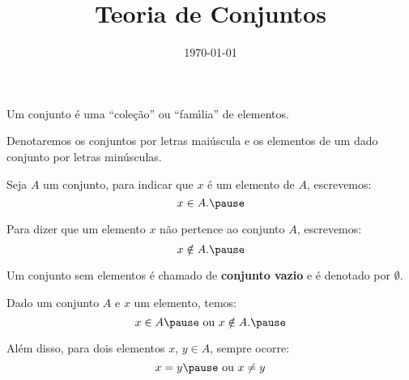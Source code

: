 \documentclass{beamer}
\title{Teoria de Conjuntos}
\author[\autor]{\autor}
\institute[\instituto]{\instituto}
\date{\today}
\begin{document}
    \begin{frame}
        \maketitle
    \end{frame}


    \begin{frame}
        Um conjunto {\'e} uma ``cole{\c c}{\~a}o'' ou ``fam{\'\i}lia'' de elementos.\pause

        Denotaremos os conjuntos por letras maiúscula e os elementos de um dado conjunto por letras min{\'u}sculas.\pause

        Seja $A$ um conjunto, para indicar que $x$ {\'e} um elemento de $A$, escrevemos:
        \[
            x \in A.\pause
        \]

        Para dizer que um elemento $x$ n{\~a}o pertence ao conjunto $A$, escrevemos:
        \[
            x \notin A.\pause
        \]

        Um conjunto sem elementos {\'e} chamado de \textbf{conjunto vazio} e {\'e} denotado por $\emptyset$.\pause

        Dado um conjunto $A$ e $x$ um elemento, temos:\pause
        \[
            x \in A\pause \mbox{ ou } x \notin A.\pause
        \]

        Al{\'e}m disso, para dois elementos $x$, $y \in A$, sempre ocorre:\pause
        \[
            x = y\pause \mbox{ ou } x \neq y
        \]
    \end{frame}
\end{document}
